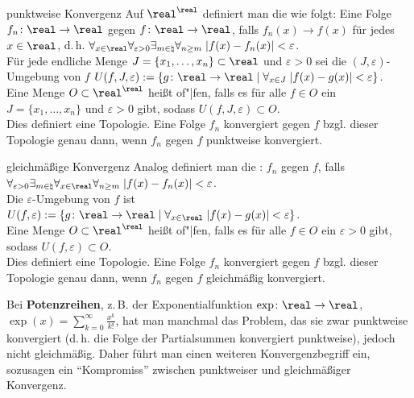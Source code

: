 \begin{Def}{punktweise Konvergenz}
    Auf $\real^\real$ definiert man die
     wie folgt:
    Eine Folge $f_n\colon \real \rightarrow \real$
    gegen $f\colon \real \rightarrow \real$, falls $f_n(x) \to f(x)$ für jedes
    $x \in \real$, d.\,h.
    $\forall_{x \in \real} \forall_{\varepsilon > 0} \exists_{m \in \natural}
    \forall_{n \ge m}\; |f(x) - f_n(x)| < \varepsilon$. \\
    Für jede endliche Menge $J = \{x_1, \dotsc, x_n\} \subset \real$ und
    $\varepsilon > 0$ sei die $(J, \varepsilon)$-Umgebung von $f$
    $U(f, J, \varepsilon) := \{g\colon \real \rightarrow \real \;|\;
    \forall_{x \in J}\; |f(x) - g(x)| < \varepsilon\}$. \\
    Eine Menge $O \subset \real^\real$ heißt of"|fen, falls es für alle
    $f \in O$ ein $J = \{x_1, \dotsc, x_n\}$ und $\varepsilon > 0$ gibt, sodass
    $U(f, J, \varepsilon) \subset O$. \\
    Dies definiert eine Topologie.
    Eine Folge $f_n$ konvergiert gegen $f$ bzgl. dieser Topologie genau dann,
    wenn $f_n$ gegen $f$ punktweise konvergiert.
\end{Def}

\linie

\begin{Def}{gleichmäßige Konvergenz}
    Analog definiert man die
    :
    $f_n$  gegen $f$, falls
    $\forall_{\varepsilon > 0} \exists_{m \in \natural} \forall_{x \in \real}
    \forall_{n \ge m}\; |f(x) - f_n(x)| < \varepsilon$. \\
    Die $\varepsilon$-Umgebung von $f$ ist
    $U(f, \varepsilon) := \{g\colon \real \rightarrow \real \;|\;
    \forall_{x \in \real}\; |f(x) - g(x)| < \varepsilon\}$. \\
    Eine Menge $O \subset \real^\real$ heißt of"|fen, falls es für alle
    $f \in O$ ein $\varepsilon > 0$ gibt, sodass
    $U(f, \varepsilon) \subset O$. \\
    Dies definiert eine Topologie.
    Eine Folge $f_n$ konvergiert gegen $f$ bzgl. dieser Topologie genau dann,
    wenn $f_n$ gegen $f$ gleichmäßig konvergiert.
\end{Def}

\linie

Bei \textbf{Potenzreihen}, z.\,B. der Exponentialfunktion
$\exp\colon \real \rightarrow \real$,
$\exp(x) = \sum_{k=0}^\infty \frac{x^k}{k!}$, hat man manchmal das Problem, das
sie zwar punktweise konvergiert (d.\,h. die Folge der Partialsummen
konvergiert punktweise), jedoch nicht gleichmäßig.
Daher führt man einen weiteren Konvergenzbegriff ein, sozusagen ein
"`Kompromiss"' zwischen punktweiser und gleichmäßiger Konvergenz.

